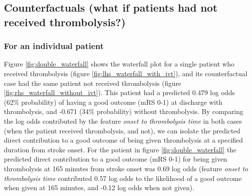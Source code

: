 \subsection{Counterfactuals (what if patients had not received thrombolysis?)}

\subsubsection{For an individual patient}

Figure \ref{fig:double_waterfall} shows the waterfall plot for a single patient who received thrombolysis (figure \ref{fig:lhs_waterfall_with_ivt}), and its counterfactual case had the same patient not received thrombolysis (figure \ref{fig:rhs_waterfall_without_ivt}). This patient had a predicted 0.479 log odds (62\% probability) of having a good outcome (mRS 0-1) at discharge with thrombolysis, and -0.671 (34\% probability) without thrombolysis. By comparing the log odds contributed by the feature \textit{onset to thrombolysis time} in both cases (when the patient received thrombolysis, and not), we can isolate the predicted direct contribution to a good outcome of being given thrombolysis at a specified duration from stroke onset. For the patient in figure \ref{fig:double_waterfall} the predicted direct contribution to a good outcome (mRS 0-1) for being given thrombolysis at 165 minutes from stroke onset was 0.69 log odds (feature \textit{onset to thrombolysis time} contributed 0.57 log odds to the likelihood of a good outcome when given at 165 minutes, and -0.12 log odds when not given).

